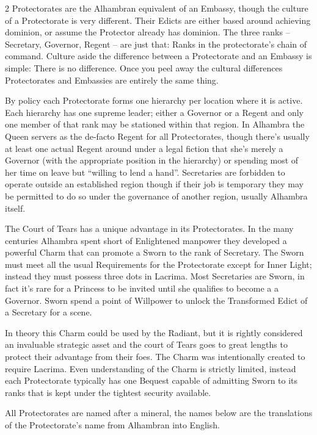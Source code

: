 \begin{multicols}{2}
Protectorates are the Alhambran equivalent of an Embassy, though the culture of a Protectorate is very different. Their Edicts are either based around achieving dominion, or assume the Protector already has dominion. The three ranks – Secretary, Governor, Regent – are just that: Ranks in the protectorate's chain of command. Culture aside the difference between a Protectorate and an Embassy is simple: There is no difference. Once you peel away the cultural differences Protectorates and Embassies are entirely the same thing.

By policy each Protectorate forms one hierarchy per location where it is active. Each hierarchy has one supreme leader; either a Governor or a Regent and only one member of that rank may be stationed within that region. In Alhambra the Queen servers as the de-facto Regent for all Protectorates, though there's usually at least one actual Regent around under a legal fiction that she's merely a Governor (with the appropriate position in the hierarchy) or spending most of her time on leave but \textquotedblleft willing to lend a hand\textquotedblright . Secretaries are forbidden to operate outside an established region though if their job is temporary they may be permitted to do so under the governance of another region, usually Alhambra itself.

The Court of Tears has a unique advantage in its Protectorates. In the many centuries Alhambra spent short of Enlightened manpower they developed a powerful Charm that can promote a Sworn to the rank of Secretary. The Sworn must meet all the usual Requirements for the Protectorate except for Inner Light; instead they must possess three dots in Lacrima. Most Secretaries are Sworn, in fact it's rare for a Princess to be invited until she qualifies to become a a Governor. Sworn spend a point of Willpower to unlock the Transformed Edict of a Secretary for a scene.

In theory this Charm could be used by the Radiant, but it is rightly considered an invaluable strategic asset and the court of Tears goes to great lengths to protect their advantage from their foes. The Charm was intentionally created to require Lacrima. Even understanding of the Charm is strictly limited, instead each Protectorate typically has one Bequest capable of admitting Sworn to its ranks that is kept under the tightest security available. 

All Protectorates are named after a mineral, the names below are the translations of the Protectorate's name from Alhambran into English. 


\end{multicols}
